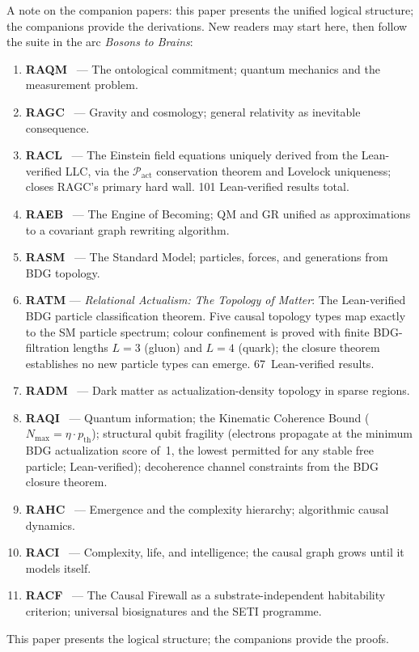 \documentclass[11pt,a4paper]{article}
\begin{document}
A note on the companion papers: this paper presents the unified logical
structure; the companions provide the derivations. New readers may start
here, then follow the suite in the arc \emph{Bosons to Brains}:
\begin{enumerate}[noitemsep,label=\arabic*.,leftmargin=*]
  \item \textbf{RAQM}~\citep{Sandeman2026RAQM} --- The ontological commitment;
  quantum mechanics and the measurement problem.
  \item \textbf{RAGC}~\citep{Sandeman2026RAGC} --- Gravity and cosmology;
  general relativity as inevitable consequence.
  \item \textbf{RACL}~\citep{Sandeman2026RACL} --- The Einstein field
  equations uniquely derived from the Lean-verified LLC, via the
  $\mathcal{P}_{\mathrm{act}}$ conservation theorem and Lovelock uniqueness;
  closes RAGC's primary hard wall. 101 Lean-verified results total.
  \item \textbf{RAEB}~\citep{Sandeman2026RAEB} --- The Engine of Becoming;
  QM and GR unified as approximations to a covariant graph rewriting algorithm.
  \item \textbf{RASM}~\citep{Sandeman2026RASM} --- The Standard Model;
  particles, forces, and generations from BDG topology.
  \item \textbf{RATM} --- \emph{Relational Actualism: The Topology of Matter}: The Lean-verified BDG particle classification theorem. Five causal topology types map exactly to the SM particle spectrum; colour confinement is proved with finite BDG-filtration lengths $L=3$ (gluon) and $L=4$ (quark); the closure theorem establishes no new particle types can emerge. 67~Lean-verified results.

\item \textbf{RADM}~\citep{Sandeman2026RADM} --- Dark matter as
  actualization-density topology in sparse regions.
  \item \textbf{RAQI}~\citep{Sandeman2026RAQI} --- Quantum information;
  the Kinematic Coherence Bound ($N_{\max} = \eta \cdot p_{\mathrm{th}}$);
  structural qubit fragility (electrons propagate at the minimum BDG
  actualization score of~1, the lowest permitted for any stable free particle;
  Lean-verified); decoherence channel constraints from the BDG closure theorem.
  \item \textbf{RAHC}~\citep{Sandeman2026RAHC} --- Emergence and the
  complexity hierarchy; algorithmic causal dynamics.
  \item \textbf{RACI}~\citep{Sandeman2026RACI} --- Complexity, life,
  and intelligence; the causal graph grows until it models itself.
  \item \textbf{RACF}~\citep{Sandeman2026RACF} --- The Causal Firewall
  as a substrate-independent habitability criterion; universal
  biosignatures and the SETI programme.
\end{enumerate}
This paper presents the logical structure; the companions provide the proofs.
\end{document}
